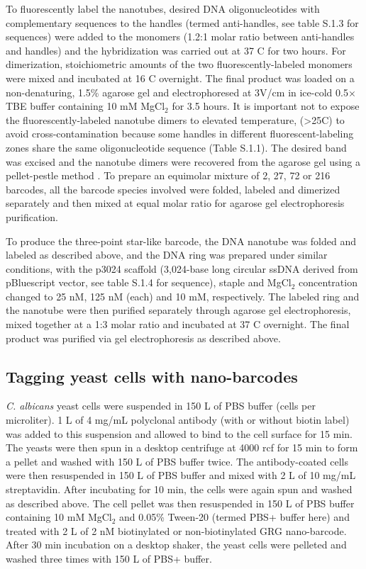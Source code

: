  To fluorescently label the nanotubes, desired DNA oligonucleotides with complementary sequences to the handles (termed anti-handles, see table S.1.3 for sequences) were added to the monomers (1.2:1 molar ratio between anti-handles and handles) and the hybridization was carried out at 37 \textdegree C for two hours. For dimerization, stoichiometric amounts of the two fluorescently-labeled monomers were mixed and incubated at 16 \textdegree C overnight. The final product was loaded on a non-denaturing, 1.5\% agarose gel and electrophoresed at 3V/cm in ice-cold 0.5× TBE buffer containing 10 mM MgCl$_2$ for 3.5 hours. It is important not to expose the fluorescently-labeled nanotube dimers to elevated temperature, (>25\textdegree C) to avoid cross-contamination because some handles in different fluorescent-labeling zones share the same oligonucleotide sequence (Table S.1.1). The desired band was excised and the nanotube dimers were recovered from the agarose gel using a pellet-pestle method \citep{kurien_extraction_2002}. To prepare an equimolar mixture of 2, 27, 72 or 216 barcodes, all the barcode species involved were folded, labeled and dimerized separately and then mixed at equal molar ratio for agarose gel electrophoresis purification. 

To produce the three-point star-like barcode, the DNA nanotube was folded and labeled as described above, and the DNA ring was prepared under similar conditions, with the p3024 scaffold (3,024-base long circular ssDNA derived from pBluescript vector, see table S.1.4 for sequence), staple and MgCl$_2$ concentration changed to 25 nM, 125 nM (each) and 10 mM, respectively. The labeled ring and the nanotube were then purified separately through agarose gel electrophoresis, mixed together at a 1:3 molar ratio and incubated at 37 \textdegree C overnight. The final product was purified via gel electrophoresis as described above.

\subsection{Tagging yeast cells with nano-barcodes}
\textit{C. albicans} yeast cells were suspended in 150 \textmu L of PBS buffer (cells per microliter). 1 \textmu L of 4 mg/mL polyclonal antibody (with or without biotin label) was added to this suspension and allowed to bind to the cell surface for 15 min. The yeasts were then spun in a desktop centrifuge at 4000 rcf for 15 min to form a pellet and washed with 150 \textmu L of PBS buffer twice. The antibody-coated cells were then resuspended in 150 \textmu L of PBS buffer and mixed with 2 \textmu L of 10 mg/mL streptavidin. After incubating for 10 min, the cells were again spun and washed as described above. The cell pellet was then resuspended in 150 \textmu L of PBS buffer containing 10 mM MgCl$_2$ and 0.05\% Tween-20 (termed PBS+ buffer here) and treated with 2 \textmu L of 2 nM biotinylated or non-biotinylated GRG nano-barcode. After 30 min incubation on a desktop shaker, the yeast cells were pelleted and washed three times with 150 \textmu L of PBS+ buffer.


